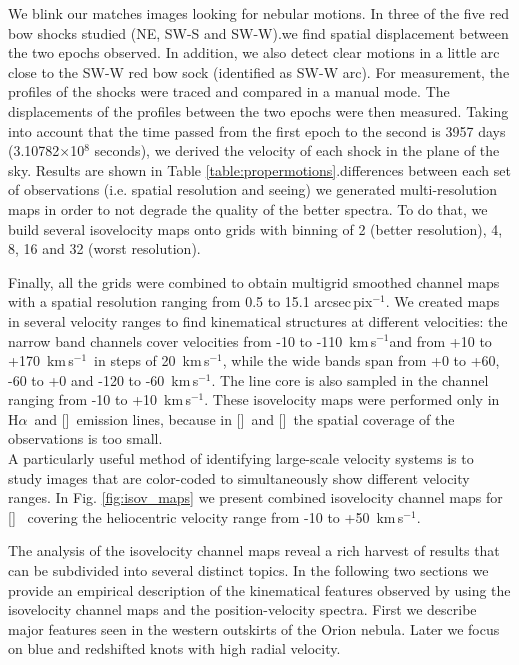 \documentclass[a4paper,fleqn,usenatbib]{mnras}     %
\newcommand{\Ha} {H$\alpha$}      		%
\newcommand{\NII} {[\ion{N}{ii}]}            %
\newcommand{\SII} {[\ion{S}{ii}]}             %
\newcommand{\OIII} {[\ion{O}{iii}]}          %
\newcommand{\kms}{\,km\,s$^{-1}$}	       %
\begin{document}
We blink our matches images looking for nebular motions. In three of the five red bow shocks studied (NE, SW-S and SW-W).we find spatial displacement between the two epochs observed. In addition, we also detect clear motions in a little arc close to the SW-W red bow sock (identified as SW-W arc). For measurement, the profiles of the shocks were traced and compared in a manual mode. The displacements of the profiles between the two epochs were then measured. Taking into account that the time passed from the first epoch to the second is 3957 days (3.10782$\times$10$^8$ seconds), we derived the velocity of each shock in the plane of the sky. Results are shown in Table \ref{table:propermotions}.differences between each set of observations (i.e. spatial resolution and seeing) we generated 
multi-resolution maps in order to not degrade the quality of the better spectra. To do that, we build several isovelocity 
maps onto grids with binning of 2 (better resolution), 4, 8, 16 and 32 (worst resolution).

Finally, all the grids were combined to obtain multigrid smoothed channel maps with a spatial resolution ranging 
from 0.5 to 15.1 arcsec\,pix$^{-1}$. We created maps in several velocity ranges to find kinematical structures at different 
velocities: the narrow band channels cover velocities from -10 to -110 \kms and from +10 to +170 \kms~in steps of 
20 \kms, while the wide bands span from +0 to +60, -60 to +0 and -120 to -60 \kms. The line core is also sampled in the 
channel ranging from -10 to +10 \kms. These isovelocity maps were performed only in \Ha~and \NII~emission lines, because 
in \SII~and \OIII~the spatial coverage of the observations is too small.\\


A particularly useful method of identifying large-scale velocity systems is to study images that are color-coded to simultaneously 
show different velocity ranges. In Fig. \ref{fig:isov_maps} we present combined isovelocity channel maps for \NII~ covering the 
heliocentric velocity range from -10 to +50 \kms. 

The analysis of the isovelocity channel maps reveal a rich harvest of results that can be subdivided into several distinct topics. 
In the following two sections we provide an empirical description of the kinematical features observed by using the isovelocity 
channel maps and the position-velocity spectra. First we describe major features seen in the western outskirts of the Orion 
nebula. Later we focus on blue and redshifted knots with high radial velocity. 
\end{document}
